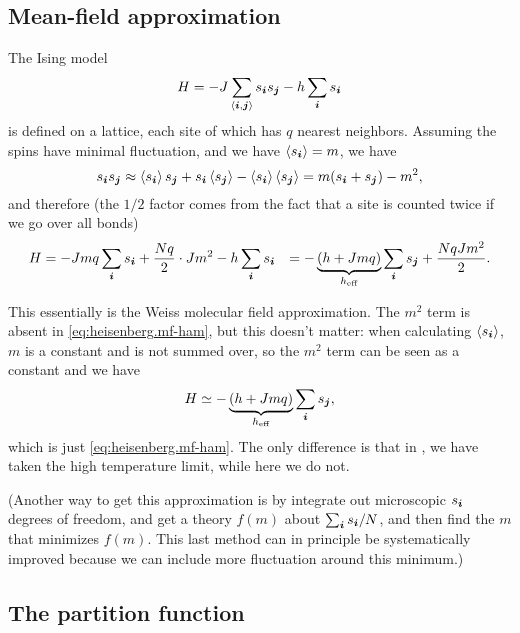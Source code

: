 \documentclass[hyperref, a4paper]{article}
\newcommand*{\pair}[1]{\langle #1 \rangle}
\def\\{}%
\begin{document}
\subsection{Mean-field approximation}\label{sec:ising.mf}

The Ising model 
\begin{equation}
    H = - J \sum_{\pair{\vb*{i}, \vb*{j}}} s_{\vb*{i}} s_{\vb*{j}} - h \sum_{\vb*{i}} s_{\vb*{i}}
\end{equation}
is defined on a lattice,
each site of which has $q$ nearest neighbors.
Assuming the spins have minimal fluctuation, 
and we have $\expval{s_{\vb*{i}}} = m$, 
we have 
\[
    s_{\vb*{i}} s_{\vb*{j}} \approx 
    \expval{s_{\vb*{i}}} s_{\vb*{j}} + s_{\vb*{i}} \expval{s_{\vb*{j}}} 
    - \expval{s_{\vb*{i}}} \expval{s_{\vb*{j}}} = 
    m (s_{\vb*{i}} + s_{\vb*{j}}) - m^2,
\]
and therefore (the $1/2$ factor comes from the fact that a site is counted twice 
if we go over all bonds)
\begin{equation}
    \begin{aligned}
        H &= - J m q \sum_{\vb*{i}} s_{\vb*{i}} 
        + \frac{N q}{2} \cdot J m^2 - h \sum_{\vb*{i}} s_{\vb*{i}} \\
        &= - \underbrace{(h + Jmq)}_{h_{\text{eff}}} \sum_{\vb*{i}} s_{\vb*{j}} 
        + \frac{NqJm^2}{2} .
    \end{aligned}
    \label{eq:ising.mean-field-ham}
\end{equation}

This essentially is the Weiss molecular field approximation.
The $m^2$ term is absent in \eqref{eq:heisenberg.mf-ham}, 
but this doesn't matter: 
when calculating $\expval{s_{\vb*{i}}}$, 
$m$ is a constant and is not summed over, 
so the $m^2$ term can be seen as a constant 
and we have 
\[
    H \simeq - \underbrace{(h + Jmq)}_{h_{\text{eff}}} \sum_{\vb*{i}} s_{\vb*{j}} ,
\]
which is just \eqref{eq:heisenberg.mf-ham}.
The only difference is that in ,
we have taken the high temperature limit, 
while here we do not.

(Another way to get this approximation is 
by integrate out microscopic $s_{\vb*{i}}$ degrees of freedom, 
and get a theory $f(m)$ about $\sum_{\vb*{i}} s_{\vb*{i}} / N$, 
and then find the $m$ that minimizes $f(m)$.
This last method can in principle be systematically improved 
because we can include more fluctuation around this minimum.) 

\subsection{The partition function}
\end{document}
